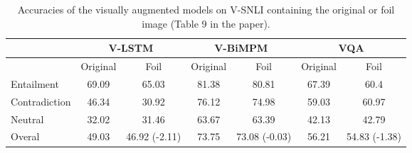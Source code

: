 \documentclass[11pt]{article}
\begin{document}
\begin{table}[!ht]
\begin{center}
\begin{tabular}{|l|cc|cc|cc|}
\hline
& \multicolumn{2}{|c|}{V-LSTM} & \multicolumn{2}{c|}{V-BiMPM} & \multicolumn{2}{c|}{VQA}\\ \hline
 & Original & Foil & Original & Foil   & Original & Foil \\\hline
Entailment & 69.09& 65.03  & 81.38  & 80.81    & 67.39& 60.4\\
Contradiction & 46.34 & 30.92 &76.12 & 74.98  & 59.03& 60.97\\
Neutral & 32.02 & 31.46  & 63.67 & 63.39   & 42.13& 42.79 \\
\hline
Overal & 49.03 &  46.92 (-2.11) & 73.75 & 73.08  (-0.03) & 56.21 &
                                                                   54.83 (-1.38) \\
\hline
\end{tabular}
\caption{Accuracies of the visually augmented models on V-SNLI containing the original or foil image (Table 9 in the paper).} \label{tab:wrongimages-supp}
\end{center}
\end{table}
\end{document}
